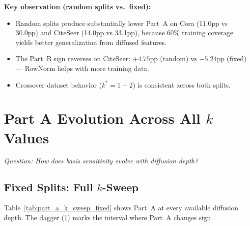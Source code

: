 \documentclass[11pt]{article}
\begin{document}
\noindent\textbf{Key observation (random splits vs.\ fixed):}
\begin{itemize}
  \item Random splits produce substantially lower Part~A on Cora (11.0pp vs 30.0pp) and
    CiteSeer (14.0pp vs 33.1pp), because 60\% training coverage yields better
    generalization from diffused features.
  \item The Part~B sign reverses on CiteSeer: $+4.75$pp (random) vs $-5.24$pp (fixed)
    --- RowNorm helps with more training data.
  \item Crossover dataset behavior ($k^*{=}1{-}2$) is consistent across both splits.
\end{itemize}

\section{Part A Evolution Across All $k$ Values}
\textit{Question: How does basis sensitivity evolve with diffusion depth?}
\label{sec:k_sweep}

\subsection{Fixed Splits: Full $k$-Sweep}

Table~\ref{tab:part_a_k_sweep_fixed} shows Part~A at every available diffusion depth.
The dagger ($\dagger$) marks the interval where Part~A changes sign.
\end{document}
